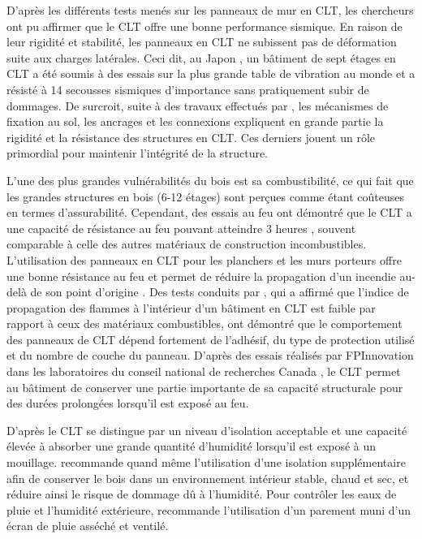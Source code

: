 \documentclass[11pt]{article}
\begin{document}
D'après les différents tests \cite{ref3} \cite{ref4} menés sur les panneaux de mur en CLT, les chercheurs ont pu affirmer que le CLT offre une bonne performance sismique. En raison de leur rigidité et stabilité, les panneaux en CLT ne subissent pas de déformation suite aux charges latérales. Ceci dit, au Japon \cite{frangi2008natural}, un bâtiment de sept étages en CLT a été soumis à des essais sur la plus grande table de vibration au monde et a résisté à 14 secousses sismiques d'importance sans pratiquement subir de dommages. De surcroit, suite à des travaux effectués par \cite{ref2}, les mécanismes de fixation au sol, les ancrages et les connexions expliquent en grande partie la rigidité et la résistance des structures en CLT. Ces derniers jouent un rôle primordial pour maintenir l'intégrité de la structure.

L'une des plus grandes vulnérabilités du bois est sa combustibilité, ce qui fait que les grandes structures en bois (6-12 étages) sont perçues comme étant coûteuses en termes d'assurabilité. Cependant, des essais au feu \cite{NRC-CNRC} ont démontré que le CLT a une capacité de résistance au feu pouvant atteindre 3 heures , souvent comparable à celle des autres matériaux de construction incombustibles. L'utilisation des panneaux en CLT pour les planchers et les murs porteurs offre une bonne résistance au feu et permet de réduire la propagation d'un incendie au-delà de son point d'origine \cite{ref5} \cite{frangi2008natural}. Des tests conduits par \cite{frangi} \cite{frangi2008natural}, qui a affirmé que l'indice de propagation des flammes à l'intérieur d'un bâtiment en CLT est faible par rapport à ceux des matériaux combustibles, ont démontré que le comportement des panneaux de CLT dépend fortement de l'adhésif, du type de protection utilisé et du nombre de couche du panneau. D'après des essais réalisés par FPInnovation dans les laboratoires du conseil national de recherches Canada \cite{NRC-CNRC}, le CLT permet au bâtiment de conserver une partie importante de sa capacité structurale pour des durées prolongées lorsqu'il est exposé au feu. 

D'après \cite{fedorik} \cite{mcclung} le CLT se distingue par un niveau d'isolation acceptable et une capacité élevée à absorber une grande quantité d'humidité lorsqu'il est exposé à un mouillage. \cite{skogstad} recommande quand même l'utilisation d'une isolation supplémentaire afin de conserver le bois dans un environnement intérieur stable, chaud et sec, et réduire ainsi le risque de dommage dû à l'humidité. Pour contrôler les eaux de pluie et l'humidité extérieure, \cite{CLThandbook} recommande l'utilisation d'un parement muni d'un écran de pluie asséché et ventilé.
\end{document}

